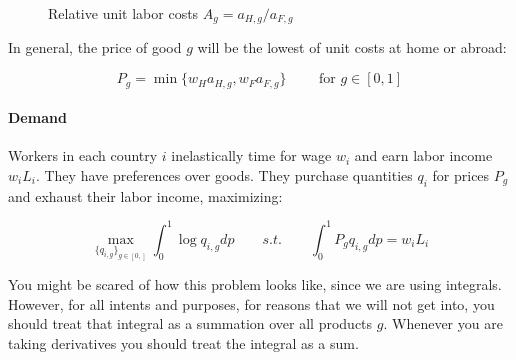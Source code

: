 \documentclass[11pt,letterpaper]{article}
\begin{document}
    \begin{figure}
        \centering
        \caption{Relative unit labor costs $A_g = a_{H,g} / a_{F,g}$}
        \label{fig: Ap}
    \end{figure}




In general, the price of good $g$ will be the lowest of unit costs at home or abroad:

        \begin{equation}
            P_{g} = \min\{w_H a_{H,g}, w_F a_{F,g}\}  \qquad \text{ for } g \in [0,1]
        \end{equation}

\paragraph{Demand} Workers in each country $i$ inelastically time for wage $w_i$ and earn labor income $w_i L_i$. They have preferences over goods. They purchase quantities $q_{i}$ for prices $P_{g}$ and exhaust their labor income, maximizing:

\begin{equation*}
    \max_{\{q_{i,g}\}_{g \in [0,]}} \int_0^1  \log q_{i,g} dp \qquad s.t. \qquad \int_0^1 P_{g}  q_{i,g} dp = w_i L_i
\end{equation*}

You might be scared of how this problem looks like, since we are using integrals. However, for all intents and purposes, for reasons that we will not get into, you should treat that integral as a summation over all products $g$. Whenever you are taking derivatives you should treat the integral as a sum.
\end{document}
